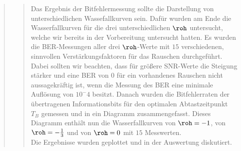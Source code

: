 \begin{quote}
\begin{quote}
        Das Ergebnis der Bitfehlermessung sollte die Darstellung von
        unterschiedlichen Wassefallkurven sein. Dafür wurden am Ende die
        Wasserfallkurven für die drei unterschiedlichen $\roh$ untersucht,
        welche wir bereits in der Vorbereitung untersucht hatten. Es wurden die
        BER-Messungen aller drei $\roh$-Werte mit $15$ verschiedenen, sinnvollen
        Verstärkungsfaktoren für das Rauschen durchgeführt. Dabei sollten wir
        beachten, dass für größere SNR-Werte die Steigung stärker und eine BER
        von $0$ für ein vorhandenes Rauschen nicht aussagekräftig ist, wenn die
        Messung des BER eine minimale Auflösung von $10^-4$ besitzt. Danach
        wurden die Bitfehlerraten der übertragenen Informationsbits für
        den optimalen Abtastzeitpunkt $T_B$ gemessen und in ein Diagramm
        zusammengefasst. Dieses Diagramm enthält nun die Wasserfallkurven von
        $\roh = -1$, von $\roh = -\frac{1}{3}$ und von $\roh = 0$ mit $15$
        Messwerten.\\
        Die Ergebnisse wurden geplottet und in der Auswertung diskutiert.  
          
    \end{quote}%

\end{quote}%


    
